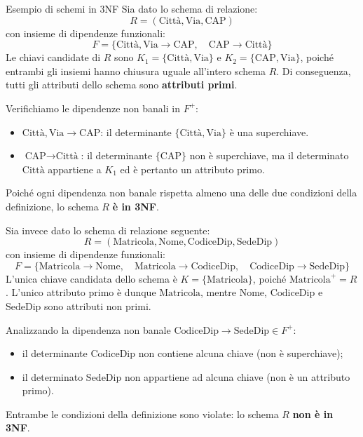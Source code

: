 \documentclass[12pt]{report}
\begin{document}
	\begin{esempio}{Esempio di schemi in 3NF}{}
		Sia dato lo schema di relazione:
		\[
		R = (\text{Città}, \text{Via}, \text{CAP})
		\]
		con insieme di dipendenze funzionali:
		\[
		F = \{ \text{Città}, \text{Via} \to \text{CAP}, \quad \text{CAP} \to \text{Città} \}
		\]
		Le chiavi candidate di $R$ sono $K_1 = \{\text{Città}, \text{Via}\}$ e $K_2 = \{\text{CAP}, \text{Via}\}$, poiché entrambi gli insiemi hanno chiusura uguale all'intero schema $R$. Di conseguenza, tutti gli attributi dello schema sono \textbf{attributi primi}.
		
		Verifichiamo le dipendenze non banali in $F^+$:
		\begin{itemize}
			\item $\text{Città}, \text{Via} \to \text{CAP}$: il determinante $\{\text{Città}, \text{Via}\}$ è una superchiave.
			\item $\text{CAP} \to \text{Città}$: il determinante $\{\text{CAP}\}$ non è superchiave, ma il determinato $\text{Città}$ appartiene a $K_1$ ed è pertanto un attributo primo.
		\end{itemize}
		Poiché ogni dipendenza non banale rispetta almeno una delle due condizioni della definizione, lo schema $R$ \textbf{è in 3NF}.
		
		\smallbreak
		Sia invece dato lo schema di relazione seguente:
		\[
		R = (\text{Matricola}, \text{Nome}, \text{CodiceDip}, \text{SedeDip})
		\]
		con insieme di dipendenze funzionali:
		\[
		F = \{ \text{Matricola} \to \text{Nome}, \quad \text{Matricola} \to \text{CodiceDip}, \quad \text{CodiceDip} \to \text{SedeDip} \}
		\]
		L'unica chiave candidata dello schema è $K = \{\text{Matricola}\}$, poiché $\text{Matricola}^+ = R$. L'unico attributo primo è dunque $\text{Matricola}$, mentre $\text{Nome}$, $\text{CodiceDip}$ e $\text{SedeDip}$ sono attributi non primi.
		
		Analizzando la dipendenza non banale $\text{CodiceDip} \to \text{SedeDip} \in F^+$:
		\begin{itemize}
			\item il determinante $\text{CodiceDip}$ non contiene alcuna chiave (non è superchiave);
			\item il determinato $\text{SedeDip}$ non appartiene ad alcuna chiave (non è un attributo primo).
		\end{itemize}
		Entrambe le condizioni della definizione sono violate: lo schema $R$ \textbf{non è in 3NF}.
	\end{esempio}
	
\end{document}

